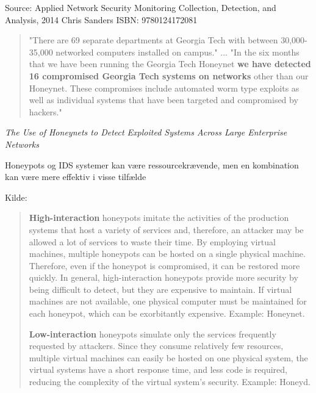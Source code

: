 \documentclass[Screen16to9,17pt]{foils}
\begin{document}
Source: Applied Network Security Monitoring Collection, Detection, and Analysis, 2014 Chris Sanders ISBN: 9780124172081


\begin{quote}
\small
"There are 69 separate departments at Georgia Tech with between 30,000-35,000
networked computers installed on campus."
...
"In the six months that we have been running the Georgia
Tech Honeynet {\bfseries we have detected 16 compromised
Georgia Tech systems on networks} other than our
Honeynet. These compromises include automated worm
type exploits as well as individual systems that have been
targeted and compromised by hackers."
\end{quote}

\begin{list1}
\item \emph{The Use of Honeynets to Detect Exploited Systems
Across Large Enterprise Networks}
\item Honeypots og IDS systemer kan være ressourcekrævende, men
en kombination kan være mere effektiv i visse tilfælde
\item Kilde: {\small
{}}
\end{list1}




\begin{quote}
{\bf High-interaction} honeypots imitate the activities of the production systems that host a variety of services and, therefore, an attacker may be allowed a lot of services to waste their time. By employing virtual machines, multiple honeypots can be hosted on a single physical machine. Therefore, even if the honeypot is compromised, it can be restored more quickly. In general, high-interaction honeypots provide more security by being difficult to detect, but they are expensive to maintain. If virtual machines are not available, one physical computer must be maintained for each honeypot, which can be exorbitantly expensive. Example: Honeynet.

{\bf Low-interaction} honeypots simulate only the services frequently requested by attackers. Since they consume relatively few resources, multiple virtual machines can easily be hosted on one physical system, the virtual systems have a short response time, and less code is required, reducing the complexity of the virtual system's security. Example: Honeyd.
\end{quote}
\end{document}
